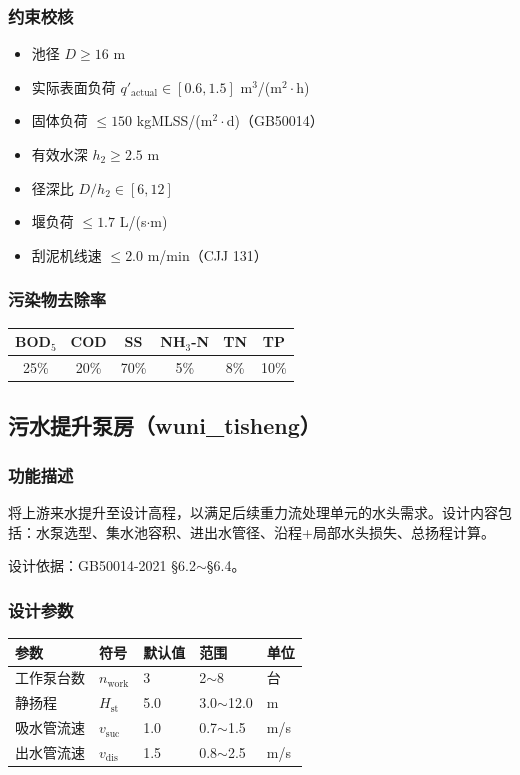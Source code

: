 \documentclass[12pt,a4paper]{ctexart}
\begin{document}
\subsubsection{约束校核}
\begin{itemize}[itemsep=0pt]
    \item 池径 $D \geq 16$ m
    \item 实际表面负荷 $q'_{\text{actual}} \in [0.6, 1.5]$ m$^3$/(m$^2\cdot$h)
    \item 固体负荷 $\leq 150$ kgMLSS/(m$^2\cdot$d)（GB50014）
    \item 有效水深 $h_2 \geq 2.5$ m
    \item 径深比 $D/h_2 \in [6, 12]$
    \item 堰负荷 $\leq 1.7$ L/(s$\cdot$m)
    \item 刮泥机线速 $\leq 2.0$ m/min（CJJ 131）
\end{itemize}

\subsubsection{污染物去除率}
\begin{table}[h]
\centering
\begin{tabular}{@{}cccccc@{}}
\toprule
BOD$_5$ & COD & SS & NH$_3$-N & TN & TP \\
\midrule
25\% & 20\% & 70\% & 5\% & 8\% & 10\% \\
\bottomrule
\end{tabular}
\end{table}

\newpage

\subsection{污水提升泵房（wuni\_tisheng）}

\subsubsection{功能描述}
将上游来水提升至设计高程，以满足后续重力流处理单元的水头需求。设计内容包括：水泵选型、集水池容积、进出水管径、沿程+局部水头损失、总扬程计算。

设计依据：GB50014-2021 \S6.2$\sim$\S6.4。

\subsubsection{设计参数}
\begin{table}[h]
\centering
\begin{tabular}{@{}lllll@{}}
\toprule
参数 & 符号 & 默认值 & 范围 & 单位 \\
\midrule
工作泵台数   & $n_{\text{work}}$ & 3 & 2$\sim$8 & 台 \\
静扬程       & $H_{\text{st}}$ & 5.0 & 3.0$\sim$12.0 & m \\
吸水管流速   & $v_{\text{suc}}$ & 1.0 & 0.7$\sim$1.5 & m/s \\
出水管流速   & $v_{\text{dis}}$ & 1.5 & 0.8$\sim$2.5 & m/s \\
\bottomrule
\end{tabular}
\end{table}
\end{document}
